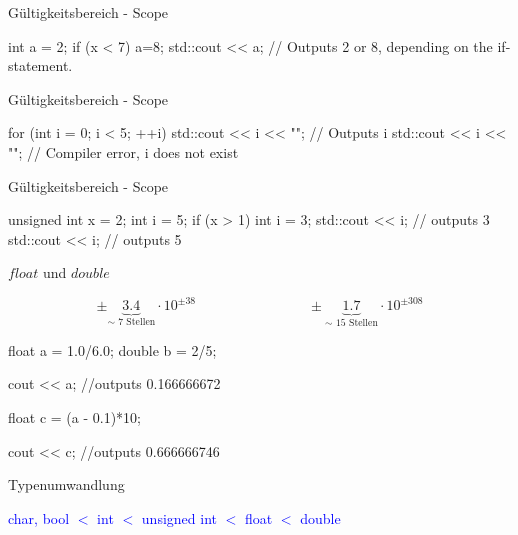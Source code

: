\documentclass[handout,usenames,dvipsnames]{beamer}
\begin{document}
\begin{frame}[fragile]{Gültigkeitsbereich - Scope}
\begin{TFCpp}
int a = 2;
if (x < 7) {
a=8;
}
std::cout << a; // Outputs 2 or 8, depending on the if-statement.
\end{TFCpp}
\end{frame}


\begin{frame}[fragile]{Gültigkeitsbereich - Scope}
\begin{TFCpp}
for (int i = 0; i < 5; ++i) {
std::cout << i << "\n"; // Outputs i
}
std::cout << i << "\n"; // Compiler error, i does not exist
\end{TFCpp}
\end{frame}

\begin{frame}[fragile]{Gültigkeitsbereich - Scope}
\begin{TFCpp}
unsigned int x = 2;
int i = 5;
if (x > 1) {
int i = 3;
std::cout << i; // outputs 3
}
std::cout << i; // outputs 5
\end{TFCpp}
\end{frame}

\begin{frame}[fragile]{$float$ und $double$}

\vspace{-3ex}

\begin{equation*}
\pm \underbrace{3.4}_{\sim\text{ 7 Stellen}}\cdot 10^{\pm 38} \qquad\qquad\qquad\qquad\pm \underbrace{1.7}_{\sim\text{ 15 Stellen}}\cdot 10^{\pm 308}
\end{equation*}

\vspace{3ex}

\begin{TFCpp}
float a = 1.0/6.0;
double b = 2/5;

cout << a; //outputs 0.166666672

float c = (a - 0.1)*10;

cout << c; //outputs 0.666666746
\end{TFCpp}

\vfill

\end{frame}

\begin{frame}[fragile]{Typenumwandlung}
\begin{center}
\textcolor{blue}{char, bool $<$ int $<$ unsigned int $<$ float $<$ double}
\end{center}
\end{frame}
\end{document}
